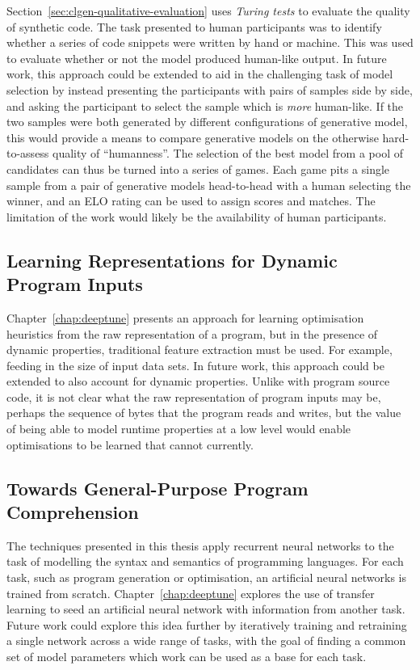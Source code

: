 Section~\ref{sec:clgen-qualitative-evaluation} uses \emph{Turing tests} to evaluate the quality of synthetic code. The task presented to human participants was to identify whether a series of code snippets were written by hand or machine. This was used to evaluate whether or not the model produced human-like output. In future work, this approach could be extended to aid in the challenging task of model selection by instead presenting the participants with pairs of samples side by side, and asking the participant to select the sample which is \emph{more} human-like. If the two samples were both generated by different configurations of generative model, this would provide a means to compare generative models on the otherwise hard-to-assess quality of ``humanness''. The selection of the best model from a pool of candidates can thus be turned into a series of games. Each game pits a single sample from a pair of generative models head-to-head with a human selecting the winner, and an ELO rating can be used to assign scores and matches. The limitation of the work would likely be the availability of human participants.


\subsection{Learning Representations for Dynamic Program Inputs}

Chapter~\ref{chap:deeptune} presents an approach for learning optimisation heuristics from the raw representation of a program, but in the presence of dynamic properties, traditional feature extraction must be used. For example, feeding in the size of input data sets. In future work, this approach could be extended to also account for dynamic properties. Unlike with program source code, it is not clear what the raw representation of program inputs may be, perhaps the sequence of bytes that the program reads and writes, but the value of being able to model runtime properties at a low level would enable optimisations to be learned that cannot currently.


\subsection{Towards General-Purpose Program Comprehension}

The techniques presented in this thesis apply recurrent neural networks to the task of modelling the syntax and semantics of programming languages. For each task, such as program generation or optimisation, an artificial neural networks is trained from scratch. Chapter~\ref{chap:deeptune} explores the use of transfer learning to seed an artificial neural network with information from another task. Future work could explore this idea further by iteratively training and retraining a single network across a wide range of tasks, with the goal of finding a common set of model parameters which work can be used as a base for each task.

